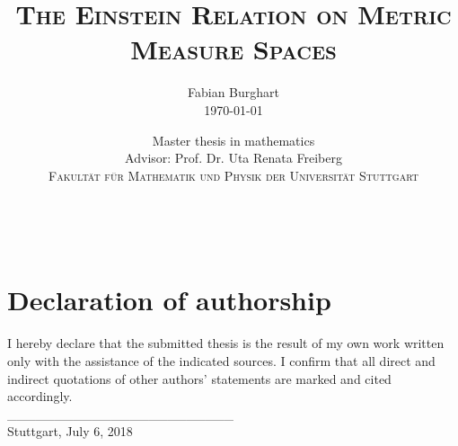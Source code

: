 \documentclass[a4paper,11pt,twoside,notitlepage]{report}
\title{$\ $\\ \textsc{The Einstein Relation on Metric Measure Spaces}\\$\ $}
\author{{\Large {Fabian Burghart}}\\[1em]
  {\large {\today}}\\[10em]}
\date{{\large Master thesis in mathematics}\\
  {\large Advisor: Prof. Dr. Uta Renata Freiberg}\\[7em]
  {\large \textsc{Fakult{\"a}t f{\"u}r Mathematik und Physik der Universit{\"a}t Stuttgart}}}
\begin{document}
\maketitle
\thispagestyle{empty}
\newpage

\thispagestyle{empty}
$\ $

\newpage

\tableofcontents













\nocite{*}   %

\printbibliography[heading=bibintoc]

\newpage
\thispagestyle{empty}
$\ $\\[15em]
\section*{Declaration of authorship}

I hereby declare that the submitted thesis is the result of my own work written only with the assistance of the indicated sources. I confirm that all direct and indirect quotations of other authors' statements are marked and cited accordingly.\\[5em]
\_\_\_\_\_\_\_\_\_\_\_\_\_\_\_\_\_\_\_\_\_\_\_\_\\
Stuttgart, July 6, 2018
\end{document}
